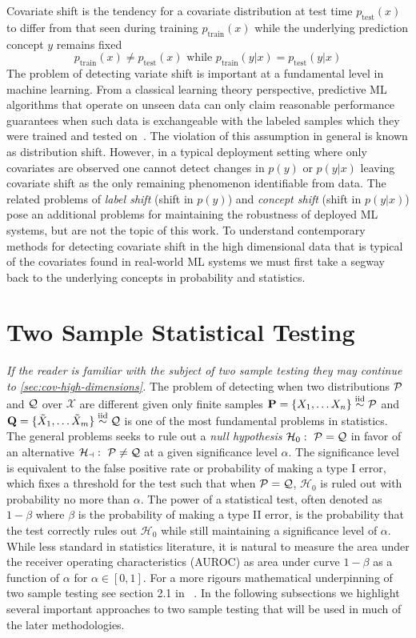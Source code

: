 Covariate shift is the tendency for a covariate distribution at test time $p_{\text{test}}(x)$ to differ from that seen
during training $p_{\text{train}}(x)$ while the underlying prediction concept $y$ remains fixed~\citep{covbook}
\[p_{\text{train}}(x)\neq p_{\text{test}}(x) \text{ while } p_{\text{train}}(y|x)=p_{\text{test}}(y|x)\]
The problem of detecting variate shift is important at a fundamental level in machine learning.
From a classical learning theory perspective, predictive ML algorithms that operate on unseen data
can only claim reasonable performance guarantees when such data is exchangeable with the labeled samples which they were trained and tested on~\citep{Haussler90probablyapproximately}.
The violation of this assumption in general is known as distribution shift.
However, in a typical deployment setting where only covariates are observed one cannot detect changes in $p(y)$ or $p(y|x)$ leaving covariate shift as the only remaining phenomenon identifiable from data.
The related problems of \textit{label shift} ({shift in $p(y)$}) and \textit{concept shift} (shift in $p(y|x)$) pose an additional problems for maintaining the robustness of deployed ML systems, but are not the topic of this work.
To understand contemporary methods for detecting covariate shift in the high dimensional data that is typical of the covariates found in real-world ML systems we must first take a segway back to the underlying concepts in probability and statistics.


\section{Two Sample Statistical Testing}
\textit{If the reader is familiar with the subject of two sample testing they may continue to \autoref{sec:cov-high-dimensions}.}
\smallbreak\noindent
The problem of detecting when two distributions $\mathcal{P}$ and $\mathcal{Q}$ over $\mathcal{X}$ are different given only finite samples $\mathbf{P}=\{X_1,\ldots X_n\}\overset{\text{iid}}{\sim} {\mathcal{P}}$ and $\mathbf{Q}=\{\tilde{X}_1,\ldots \tilde{X}_m\}\overset{\text{iid}}{\sim} {\mathcal{Q}}$ is one of the most fundamental problems in statistics.
The general problems seeks to rule out a \textit{null hypothesis} $\mathcal{H}_0:\ \mathcal{P}=\mathcal{Q}$ in favor of an alternative $\mathcal{H_a}:\ \mathcal{P}\neq \mathcal{Q}$ at a given significance level $\alpha$.
The significance level is equivalent to the false positive rate or probability of making a type I error, which fixes a threshold for the test such that when $\mathcal{P}=\mathcal{Q}$, $\mathcal{H}_0$ is ruled out with probability no more than $\alpha$.
The power of a statistical test, often denoted as $1-\beta$ where $\beta$ is the probability of making a type II error, is the probability that the test correctly rules out $\mathcal{H}_0$ while still maintaining a significance level of $\alpha$.
While less standard in statistics literature, it is natural to measure the area under the receiver operating characteristics (AUROC) as area under curve $1-\beta$ as a function of $\alpha$ for $\alpha\in [0,1]$.
For a more rigours mathematical underpinning of two sample testing see section 2.1 in ~\citeauthor{twosampletestingbackground}.
In the following subsections we highlight several important approaches to two sample testing that will be used in much of the later methodologies.


